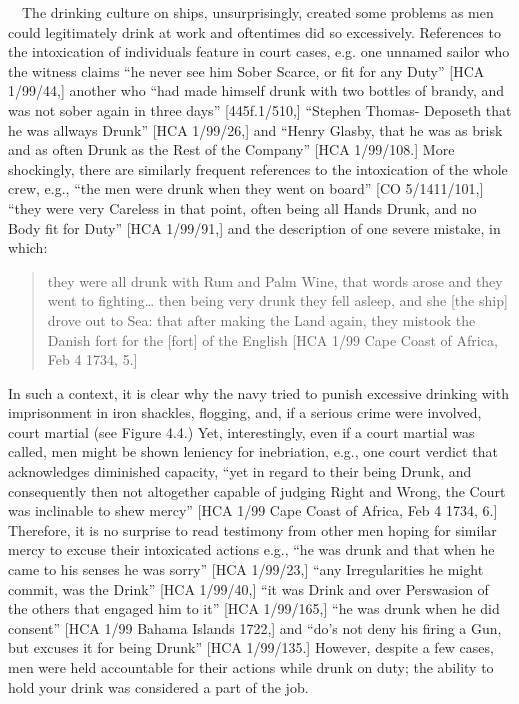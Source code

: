 \begin{styleStandard}
\ \ The drinking culture on ships, unsurprisingly, created some problems as men could legitimately drink at work and oftentimes did so excessively. References to the intoxication of individuals feature in court cases, e.g. one unnamed sailor who the witness claims “he never see him Sober Scarce, or fit for any Duty” [HCA 1/99/44,] another who “had made himself drunk with two bottles of brandy, and was not sober again in three days” [445f.1/510,] “Stephen Thomas- Deposeth that he was allways Drunk” [HCA 1/99/26,] and “Henry Glasby, that he was as brisk and as often Drunk as the Rest of the Company” [HCA 1/99/108.] More shockingly, there are similarly frequent references to the intoxication of the whole crew, e.g., “the men were drunk when they went on board” [CO 5/1411/101,] “they were very Careless in that point, often being all Hands Drunk, and no Body fit for Duty” [HCA 1/99/91,] and the description of one severe mistake, in which: 
\end{styleStandard}


\begin{quotation}
they were all drunk with Rum and Palm Wine, that words arose and they went to fighting… then being very drunk they fell asleep, and she [the ship] drove out to Sea: that after making the Land again, they mistook the Danish fort for the [fort] of the English [HCA 1/99 Cape Coast of Africa, Feb 4 1734, 5.]

\end{quotation}
\begin{styleStandard}
In such a context, it is clear why the navy tried to punish excessive drinking with imprisonment in iron shackles, flogging, and, if a serious crime were involved, court martial (see Figure 4.4.) Yet, interestingly, even if a court martial was called, men might be shown leniency for inebriation, e.g., one court verdict that acknowledges diminished capacity, “yet in regard to their being Drunk, and consequently then not altogether capable of judging Right and Wrong, the Court was inclinable to shew mercy” [HCA 1/99 Cape Coast of Africa, Feb 4 1734, 6.] Therefore, it is no surprise to read testimony from other men hoping for similar mercy to excuse their intoxicated actions e.g., “he was drunk and that when he came to his senses he was sorry” [HCA 1/99/23,] “any Irregularities he might commit, was the Drink” [HCA 1/99/40,] “it was Drink and over Perswasion of the others that engaged him to it” [HCA 1/99/165,] “he was drunk when he did consent” [HCA 1/99 Bahama Islands 1722,] and “do’s not deny his firing a Gun, but excuses it for being Drunk” [HCA 1/99/135.] However, despite a few cases, men were held accountable for their actions while drunk on duty; the ability to hold your drink was considered a part of the job. 
\end{styleStandard}


